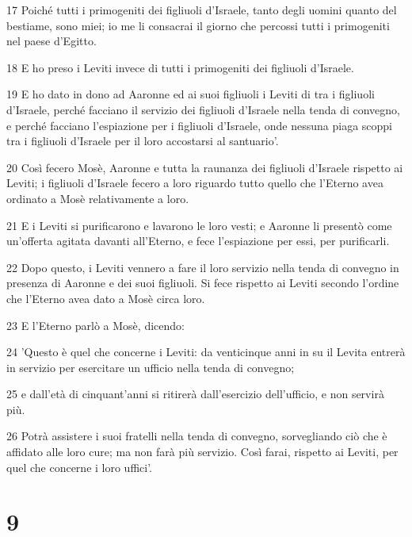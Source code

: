 \par 17 Poiché tutti i primogeniti dei figliuoli d'Israele, tanto degli uomini quanto del bestiame, sono miei; io me li consacrai il giorno che percossi tutti i primogeniti nel paese d'Egitto.
\par 18 E ho preso i Leviti invece di tutti i primogeniti dei figliuoli d'Israele.
\par 19 E ho dato in dono ad Aaronne ed ai suoi figliuoli i Leviti di tra i figliuoli d'Israele, perché facciano il servizio dei figliuoli d'Israele nella tenda di convegno, e perché facciano l'espiazione per i figliuoli d'Israele, onde nessuna piaga scoppi tra i figliuoli d'Israele per il loro accostarsi al santuario'.
\par 20 Così fecero Mosè, Aaronne e tutta la raunanza dei figliuoli d'Israele rispetto ai Leviti; i figliuoli d'Israele fecero a loro riguardo tutto quello che l'Eterno avea ordinato a Mosè relativamente a loro.
\par 21 E i Leviti si purificarono e lavarono le loro vesti; e Aaronne li presentò come un'offerta agitata davanti all'Eterno, e fece l'espiazione per essi, per purificarli.
\par 22 Dopo questo, i Leviti vennero a fare il loro servizio nella tenda di convegno in presenza di Aaronne e dei suoi figliuoli. Si fece rispetto ai Leviti secondo l'ordine che l'Eterno avea dato a Mosè circa loro.
\par 23 E l'Eterno parlò a Mosè, dicendo:
\par 24 'Questo è quel che concerne i Leviti: da venticinque anni in su il Levita entrerà in servizio per esercitare un ufficio nella tenda di convegno;
\par 25 e dall'età di cinquant'anni si ritirerà dall'esercizio dell'ufficio, e non servirà più.
\par 26 Potrà assistere i suoi fratelli nella tenda di convegno, sorvegliando ciò che è affidato alle loro cure; ma non farà più servizio. Così farai, rispetto ai Leviti, per quel che concerne i loro uffici'.

\chapter{9}

